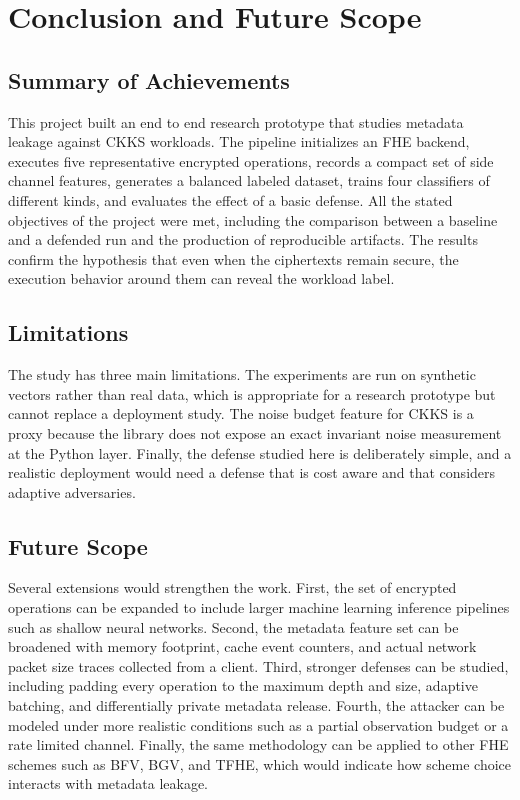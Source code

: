 \documentclass[12pt,a4paper]{article}
\begin{document}
\section{Conclusion and Future Scope}

\subsection{Summary of Achievements}
This project built an end to end research prototype that studies metadata leakage against CKKS workloads. The pipeline initializes an FHE backend, executes five representative encrypted operations, records a compact set of side channel features, generates a balanced labeled dataset, trains four classifiers of different kinds, and evaluates the effect of a basic defense. All the stated objectives of the project were met, including the comparison between a baseline and a defended run and the production of reproducible artifacts. The results confirm the hypothesis that even when the ciphertexts remain secure, the execution behavior around them can reveal the workload label.

\subsection{Limitations}
The study has three main limitations. The experiments are run on synthetic vectors rather than real data, which is appropriate for a research prototype but cannot replace a deployment study. The noise budget feature for CKKS is a proxy because the library does not expose an exact invariant noise measurement at the Python layer. Finally, the defense studied here is deliberately simple, and a realistic deployment would need a defense that is cost aware and that considers adaptive adversaries.

\subsection{Future Scope}
Several extensions would strengthen the work. First, the set of encrypted operations can be expanded to include larger machine learning inference pipelines such as shallow neural networks. Second, the metadata feature set can be broadened with memory footprint, cache event counters, and actual network packet size traces collected from a client. Third, stronger defenses can be studied, including padding every operation to the maximum depth and size, adaptive batching, and differentially private metadata release. Fourth, the attacker can be modeled under more realistic conditions such as a partial observation budget or a rate limited channel. Finally, the same methodology can be applied to other FHE schemes such as BFV, BGV, and TFHE, which would indicate how scheme choice interacts with metadata leakage.
\end{document}
